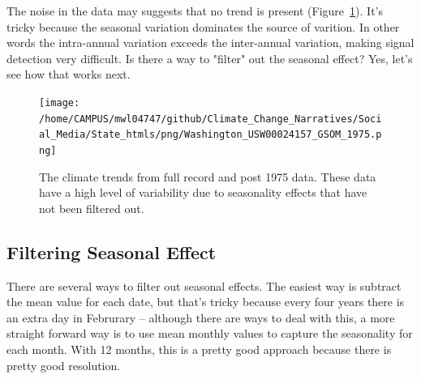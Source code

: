 \documentclass{article}
\begin{document}
\begin{knitrout}
\begin{kframe}
{\ttfamily\noindent\bfseries{}}

{\ttfamily\noindent\bfseries{}}

{\ttfamily\noindent\bfseries{}}

{\ttfamily\noindent\bfseries\color{errorcolor}{\#\# Error in eval(expr, envir, enclos): object 'GSOM' not found}}

{\ttfamily\noindent\bfseries\color{errorcolor}{\#\# Error in text(pred\_dates\$Date[location\_index], ci[location\_index, 3], : object 'pred\_dates' not found}}\end{kframe}
\end{knitrout}

The noise in the data may suggests that no trend is present (Figure~\ref{fig:GSOM-1975trend}). It's tricky because the seasonal variation dominates the source of varition. In other words the intra-annual variation exceeds the inter-annual variation, making signal detection very difficult. Is there a way to "filter" out the seasonal effect? Yes, let's see how that works next. 

\begin{figure}
\texttt{[image: /home/CAMPUS/mwl04747/github/Climate\_Change\_Narratives/Social\_Media/State\_htmls/png/Washington\_USW00024157\_GSOM\_1975.png]}
\caption{The climate trends from full record and post 1975 data. These data have a high level of variability due to seasonality effects that have not been filtered out.}
\label{fig:GSOM-1975trend}
\end{figure}


\subsection{Filtering Seasonal Effect}

There are several ways to filter out seasonal effects. The easiest way is subtract the mean value for each date, but that's tricky because every four years there is an extra day in Februrary -- although there are ways to deal with this, a more straight forward way is to use mean monthly values to capture the seasonality for each month. With 12 months, this is a pretty good approach because there is pretty good resolution. 
\end{document}
